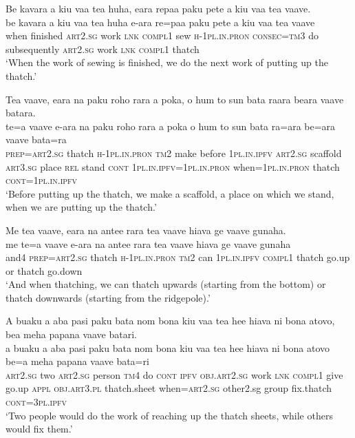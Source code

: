 \ea\label{ex:text12-34}
Be kavara a kiu vaa tea huha, eara repaa paku pete a kiu vaa tea vaave.\\
\gll be	kavara	a	kiu	vaa	tea	huha	e-ara	re=paa	paku	pete	a	kiu	vaa	tea	vaave\\
     when	finished	\textsc{art}2.\textsc{sg}	work	\textsc{lnk}	\textsc{compl}1	sew	\textsc{h}-1\textsc{pl}.\textsc{in}.\textsc{pron}	\textsc{consec}=\textsc{tm}3	do	subsequently	\textsc{art}2.\textsc{sg}	work	\textsc{lnk}	\textsc{compl}1	thatch\\
\glt `When the work of sewing is finished, we do the next work of putting up the thatch.'
\z

\ea\label{ex:text12-35}
Tea vaave, eara na paku roho rara a poka, o hum to sun bata raara beara vaave batara.\\
\gll te=a	vaave	e-ara	na	paku	roho	rara	a	poka	o	hum	to	sun	bata	ra=ara	be=ara	vaave	bata=ra\\
     \textsc{prep}=\textsc{art}2.\textsc{sg}	thatch	\textsc{h}-1\textsc{pl}.\textsc{in}.\textsc{pron}	\textsc{tm}2	make	before	1\textsc{pl}.\textsc{in}.\textsc{ipfv}	\textsc{art}2.\textsc{sg}	scaffold	\textsc{art}3.\textsc{sg}	place	\textsc{rel}	stand	\textsc{cont}	1\textsc{pl}.\textsc{in}.\textsc{ipfv}=1\textsc{pl}.\textsc{in}.\textsc{pron}	when=1\textsc{pl}.\textsc{in}.\textsc{pron}	thatch	\textsc{cont}=1\textsc{pl}.\textsc{in}.\textsc{ipfv}\\
\glt `Before putting up the thatch, we make a scaffold, a place on which we stand, when we are putting up the thatch.'
\z

\newpage
\ea\label{ex:text12-36}
Me tea vaave, eara na antee rara tea vaave hiava ge vaave gunaha.\\
\gll me	te=a	vaave	e-ara	na	antee	rara	tea	vaave	hiava	ge	vaave	gunaha\\
     and4	\textsc{prep}=\textsc{art}2.\textsc{sg}	thatch	\textsc{h}-1\textsc{pl}.\textsc{in}.\textsc{pron}	\textsc{tm}2	can	1\textsc{pl}.\textsc{in}.\textsc{ipfv}	\textsc{compl}1	thatch	go.up	or	thatch	go.down\\
\glt `And when thatching, we can thatch upwards (starting from the bottom) or thatch downwards (starting from the ridgepole).'
\z

\ea\label{ex:text12-37}
A buaku a aba pasi paku bata nom bona kiu vaa tea hee hiava ni bona atovo, bea meha papana vaave batari.\\
\gll a	buaku	a	aba	pasi	paku	bata	nom	bona	kiu	vaa	tea	hee	hiava	ni	bona	atovo	be=a	meha	papana	vaave	bata=ri\\
     \textsc{art}2.\textsc{sg}	two	\textsc{art}2.\textsc{sg}	person	\textsc{tm}4	do	\textsc{cont}	\textsc{ipfv}	\textsc{obj}.\textsc{art}2.\textsc{sg}	work	\textsc{lnk}	\textsc{compl}1	give	go.up	\textsc{appl}	\textsc{obj}.\textsc{art}3.\textsc{pl}	thatch.sheet	when=\textsc{art}2.\textsc{sg}	other2.sg	group	fix.thatch	\textsc{cont}=3\textsc{pl}.\textsc{ipfv}\\
\glt `Two people would do the work of reaching up the thatch sheets, while others would fix them.'
\z

